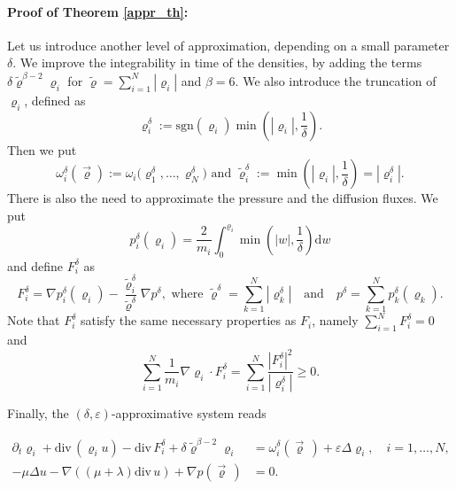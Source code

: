 \documentclass[11pt]{article}
\newcommand{\dd}{\mathrm{d}}
\newcommand{\ddiv}{\mathrm{div\,}}
\numberwithin{equation}{section}
\numberwithin{tw}{section}
\begin{document}
\paragraph{Proof of Theorem \ref{appr_th}:} Let us introduce another level of approximation, depending on a small parameter $\delta$. We improve the integrability in time of the densities, by adding the terms $\delta\tilde\varrho^{\beta-2}\varrho_i$ for
$\displaystyle\tilde\varrho = \sum_{i=1}^N |\varrho_i|$ and $\beta= 6$. We also introduce the truncation of $\varrho_i$, defined as 
\[ \varrho_i^\delta := \mathrm{sgn}(\varrho_i)\min\left(|\varrho_i|,\frac{1}{\delta}\right). \]
 Then we put
\[ \omega_i^\delta(\vec\varrho) := \omega_i\Big(\varrho_1^\delta,\dots, \varrho_N^\delta\Big) \mbox{ \ \ 
and \ \ }
 \tilde\varrho_i^\delta := \min\left(|\varrho_i|,\frac{1}{\delta}\right) = |\varrho_i^\delta|. \]
There is also the need to approximate the pressure and the diffusion fluxes. We put
\begin{equation}
    p_{i}^\delta(\varrho_i)=\frac{2}{m_i} \int_0^{\varrho_i}\min\left(|w|,\frac{1}{\delta}\right)\dd w
\end{equation}
and define $F_{i}^\delta$ as
\begin{equation}
    F_{i}^\delta= \nabla p_{i}^\delta(\varrho_i)-
\frac{\tilde\varrho_i^\delta}{\tilde \varrho^\delta}\nabla p^\delta,
\mbox{ \ where \ \ }
 \tilde \varrho^\delta = \sum_{k=1}^N \left|\varrho_k^\delta\right| \quad \text{and} \quad p^\delta = \sum_{k=1}^N p_k^\delta(\varrho_k). 
\end{equation}
Note that $F_{i}^\delta$ satisfy the same necessary properties as $F_i$, namely $\displaystyle\sum_{i=1}^N F_{i}^\delta=0$ and
\[ \sum_{i=1}^N \frac{1}{m_i}\nabla\varrho_i\cdot F_{i}^\delta = \sum_{i=1}^N \frac{|F_{i}^\delta|^2}{|\varrho_i^\delta|} \geq 0. \]

Finally, the $(\delta,\varepsilon)$-approximative system reads

\begin{equation}\label{approx2}
    \begin{aligned}
    \partial_t\varrho_{i} + \ddiv(\varrho_{i} u) -\ddiv F_{i}^\delta +\delta \tilde\varrho^{\beta-2}\varrho_i &= \omega_{i}^\delta(\vec\varrho\,) + \varepsilon\Delta\varrho_i, \quad i=1,\dots,N ,\\
   -\mu\Delta u -\nabla((\mu+\lambda)\ddiv u) + \nabla p(\vec\varrho\,) &= 0.
    \end{aligned}
\end{equation}
\end{document}
